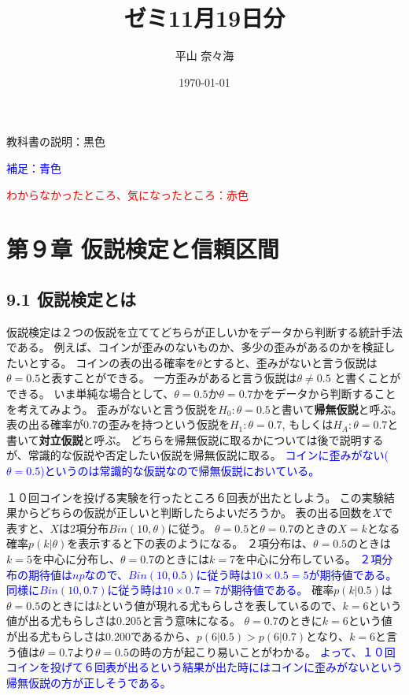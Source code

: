 \documentclass{article}
\title{ゼミ11月19日分}
\author{平山 奈々海}
\date{\today}
\begin{document}
\maketitle

教科書の説明：黒色

\textcolor{blue}{補足：青色}

\textcolor{red}{わからなかったところ、気になったところ：赤色}


\section{第９章 仮説検定と信頼区間}

\subsection{9.1 仮説検定とは}




仮説検定は２つの仮説を立ててどちらが正しいかをデータから判断する統計手法である。
例えば、コインが歪みのないものか、多少の歪みがあるのかを検証したいとする。
コインの表の出る確率を$\theta$とすると、歪みがないと言う仮説は$\theta = 0.5$と表すことができる。
一方歪みがあると言う仮説は$\theta \neq 0.5$ と書くことができる。
いま単純な場合として、$\theta = 0.5$か$\theta = 0.7$かをデータから判断することを考えてみよう。
歪みがないと言う仮説を$H_0: \theta = 0.5$と書いて\textbf{帰無仮説}と呼ぶ。
表の出る確率が$0.7$の歪みを持つという仮説を$H_1: \theta = 0.7$, もしくは$H_A: \theta = 0.7$と書いて\textbf{対立仮説}と呼ぶ。
どちらを帰無仮説に取るかについては後で説明するが、常識的な仮説や否定したい仮説を帰無仮説に取る。
\textcolor{blue}{コインに歪みがない($\theta=0.5$)というのは常識的な仮説なので帰無仮説においている。}



１０回コインを投げる実験を行ったところ６回表が出たとしよう。
この実験結果からどちらの仮説が正しいと判断したらよいだろうか。
表の出る回数を$X$で表すと、$X$は2項分布$Bin(10,\theta)$に従う。
$\theta=0.5$と$\theta=0.7$のときの$X=k$となる確率$p(k|\theta)$を表示すると下の表のようになる。
２項分布は、$\theta=0.5$のときは$k=5$を中心に分布し、$\theta=0.7$のときには$k=7$を中心に分布している。
\textcolor{blue}{２項分布の期待値は$np$なので、$Bin(10,0.5)$に従う時は$10 \times 0.5 = 5$が期待値である。同様に$Bin(10,0.7)$に従う時は$10 \times 0.7 = 7$が期待値である。}
確率$p(k|0.5)$は$\theta=0.5$のときには$k$という値が現れる尤もらしさを表しているので、$k=6$という値が出る尤もらしさは$0.205$と言う意味になる。
$\theta=0.7$のときに$k=6$という値が出る尤もらしさは$0.200$であるから、$p(6|0.5)>p(6|0.7)$となり、$k=6$と言う値は$\theta=0.7$より$\theta=0.5$の時の方が起こり易いことがわかる。
\textcolor{blue}{よって、１０回コインを投げて６回表が出るという結果が出た時にはコインに歪みがないという帰無仮説の方が正しそうである。}
\end{document}
